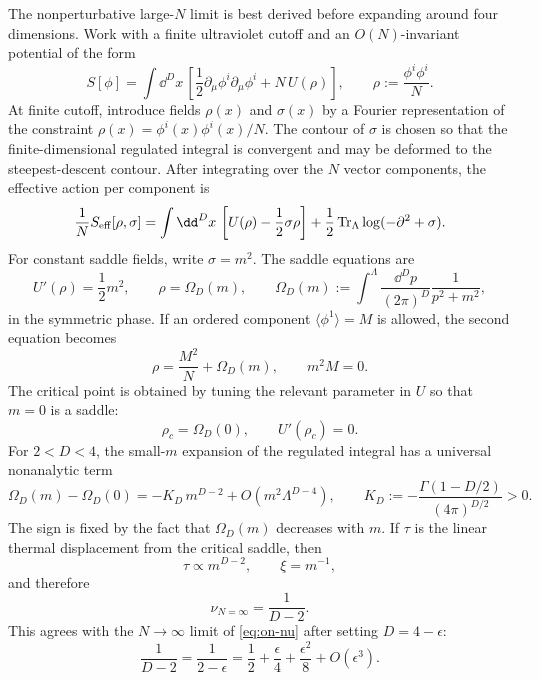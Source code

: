 The nonperturbative large-\(N\) limit is best derived before expanding around
four dimensions.  Work with a finite ultraviolet cutoff and an \(O(N)\)-invariant
potential of the form
\begin{equation}
  S[\phi]
  =
  \int \dd^D x\,
  \left[
    \frac12\partial_\mu\phi^i\partial_\mu\phi^i
    +N\,U\left(\rho\right)
  \right],
  \qquad
  \rho:=\frac{\phi^i\phi^i}{N}.
  \label{eq:on-large-n-potential-action}
\end{equation}
At finite cutoff, introduce fields \(\rho(x)\) and \(\sigma(x)\) by a
Fourier representation of the constraint
\(\rho(x)=\phi^i(x)\phi^i(x)/N\).  The contour of \(\sigma\) is chosen so
that the finite-dimensional regulated integral is convergent and may be
deformed to the steepest-descent contour.  After integrating over the
\(N\) vector components, the effective action per component is
\begin{equation}
  \frac1N S_{\rm eff}[\rho,\sigma]
  =
  \int \dd^D x\,
  \left[
    U(\rho)-\frac12\sigma\rho
  \right]
  +\frac12\operatorname{Tr}_\Lambda
    \log(-\partial^2+\sigma).
  \label{eq:on-large-n-effective-action}
\end{equation}
For constant saddle fields, write \(\sigma=m^2\).  The saddle equations are
\begin{equation}
  U'(\rho)=\frac12m^2,
  \qquad
  \rho=\Omega_D(m),
  \qquad
  \Omega_D(m)
  :=
  \int^\Lambda\frac{\dd^D p}{(2\pi)^D}\frac1{p^2+m^2},
  \label{eq:on-large-n-gap-equations}
\end{equation}
in the symmetric phase.  If an ordered component
\(\langle\phi^1\rangle=M\) is allowed, the second equation becomes
\[
  \rho=\frac{M^2}{N}+\Omega_D(m),
  \qquad
  m^2M=0.
\]
The critical point is obtained by tuning the relevant parameter in \(U\) so
that \(m=0\) is a saddle:
\[
  \rho_c=\Omega_D(0),
  \qquad
  U'(\rho_c)=0.
\]
For \(2<D<4\), the small-\(m\) expansion of the regulated integral has a
universal nonanalytic term
\begin{equation}
  \Omega_D(m)-\Omega_D(0)
  =
  -K_D\,m^{D-2}
  +O(m^2\Lambda^{D-4}),
  \qquad
  K_D:=
  -\frac{\Gamma(1-D/2)}{(4\pi)^{D/2}}>0.
  \label{eq:on-large-n-omega-expansion}
\end{equation}
The sign is fixed by the fact that \(\Omega_D(m)\) decreases with \(m\).
If \(\tau\) is the linear thermal displacement from the critical saddle, then
\[
  \tau\propto m^{D-2},
  \qquad
  \xi=m^{-1},
\]
and therefore
\begin{equation}
  \nu_{N=\infty}=\frac1{D-2}.
  \label{eq:on-large-n-nu}
\end{equation}
This agrees with the \(N\to\infty\) limit of
\eqref{eq:on-nu} after setting \(D=4-\epsilon\):
\[
  \frac1{D-2}
  =
  \frac1{2-\epsilon}
  =
  \frac12+\frac{\epsilon}{4}+\frac{\epsilon^2}{8}+O(\epsilon^3).
\]

